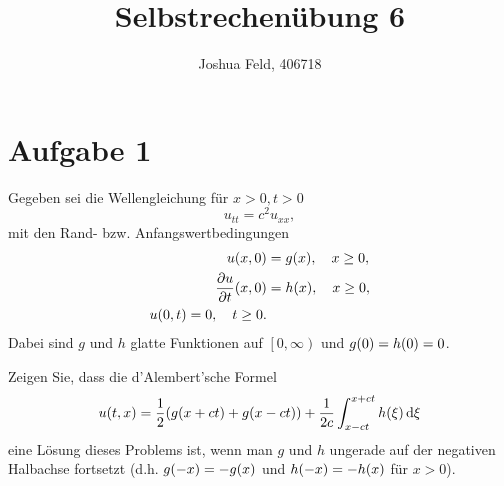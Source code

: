 \documentclass{exercise}
\institute{Applied and Computational Mathematics}
\title{Selbstrechenübung 6}
\author{Joshua Feld, 406718}
\begin{document}
    \maketitle


    \section*{Aufgabe 1}
    
    \begin{problem}
        Gegeben sei die Wellengleichung für \(x > 0, t > 0\)
        \[
            u_{tt} = c^2 u_{xx},
        \]
        mit den Rand- bzw. Anfangswertbedingungen
        \begin{align*}
            u\parentheses*{x, 0} &= g\parentheses*{x}, \quad x \ge 0,\\
            \frac{\partial u}{\partial t}\parentheses*{x, 0} &= h\parentheses*{x}, \quad x \ge 0,\\
            u\parentheses*{0, t} = 0, \quad t \ge 0.
        \end{align*}
        Dabei sind \(g\) und \(h\) glatte Funktionen auf \(\left[0, \infty\right)\) und \(g\parentheses*{0} = h\parentheses*{0} = 0\).
        
        Zeigen Sie, dass die d'Alembert'sche Formel
        \[
            u\parentheses*{t, x} = \frac{1}{2}\parentheses*{g\parentheses*{x + ct} + g\parentheses*{x - ct}} + \frac{1}{2c}\int_{x - ct}^{x + ct}h\parentheses*{\xi}\d\xi
        \]
        eine Lösung dieses Problems ist, wenn man \(g\) und \(h\) ungerade auf der negativen Halbachse fortsetzt (d.h. \(g\parentheses*{-x} = -g\parentheses*{x}\) und \(h\parentheses*{-x} = -h\parentheses*{x}\) für \(x > 0\)).
    \end{problem}
    
\end{document}
